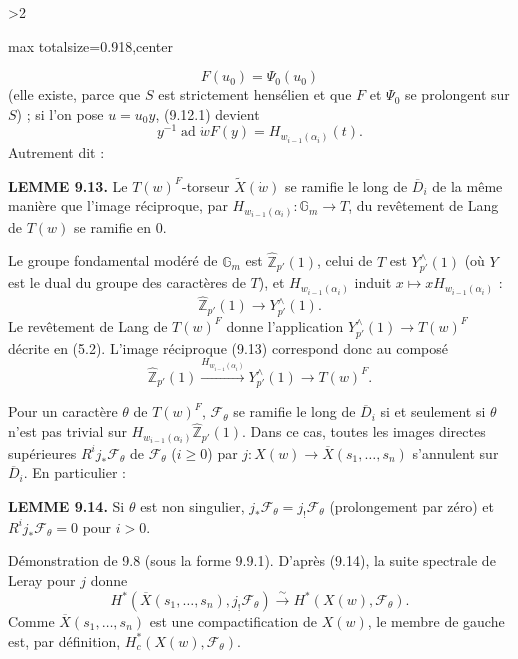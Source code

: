 \documentclass[9pt,twoside]{extarticle}
\newcommand{\EditionPage}[3]{%
  \ifnum#1>2\clearpage\fi
  \pdfbookmark[1]{Printed page #2}{fr-folio-#2}%
  \hypertarget{fr-physical-#1}{}%
  \noindent\begin{adjustbox}{max totalsize={\textwidth}{0.918\textheight},center}
  \begin{minipage}[t]{\textwidth}
  \fontsize{9.4}{11.1}\selectfont\justifying
  #3
  \end{minipage}
  \end{adjustbox}%
}
\begin{document}
\EditionPage{51}{152}{%
\[
F(u_0)=\Psi_0(u_0)
\] (elle existe, parce que \(S\) est strictement hensélien et que \(F\) et \(\Psi_0\) se prolongent sur \(S\)) ; si l'on pose \(u=u_0y\), (9.12.1) devient \[
\tag{9.12.2}
y^{-1}\operatorname{ad}\dot w F(y)=H_{w_{i-1}(\alpha_i)}(t).
\] Autrement dit :\par

\noindent\textbf{LEMME 9.13.} Le \(T(w)^F\)-torseur \(\widetilde X(\dot w)\) se ramifie le long de \(\overline D_i\) de la même manière que l'image réciproque, par \(H_{w_{i-1}(\alpha_i)}:\mathbb G_m\to T\), du revêtement de Lang de \(T(w)\) se ramifie en 0.\par

Le groupe fondamental modéré de \(\mathbb G_m\) est \(\widehat{\mathbb Z}_{p'}(1)\), celui de \(T\) est \(Y_{p'}^{\wedge}(1)\) (où \(Y\) est le dual du groupe des caractères de \(T\)), et \(H_{w_{i-1}(\alpha_i)}\) induit \(x\mapsto xH_{w_{i-1}(\alpha_i)}\) : \[
\widehat{\mathbb Z}_{p'}(1)\longrightarrow Y_{p'}^{\wedge}(1).
\] Le revêtement de Lang de \(T(w)^F\) donne l'application \(Y_{p'}^{\wedge}(1)\to T(w)^F\) décrite en (5.2). L'image réciproque (9.13) correspond donc au composé \[
\widehat{\mathbb Z}_{p'}(1)
\xrightarrow{H_{w_{i-1}(\alpha_i)}}
Y_{p'}^{\wedge}(1)
\longrightarrow T(w)^F.
\]\par

Pour un caractère \(\theta\) de \(T(w)^F\), \(\mathcal F_\theta\) se ramifie le long de \(\overline D_i\) si et seulement si \(\theta\) n'est pas trivial sur \(H_{w_{i-1}(\alpha_i)}\widehat{\mathbb Z}_{p'}(1)\). Dans ce cas, toutes les images directes supérieures \(R^ij_*\mathcal F_\theta\) de \(\mathcal F_\theta\) (\(i\ge0\)) par \(j:X(w)\to\overline X(s_1,\ldots,s_n)\) s'annulent sur \(\overline D_i\). En particulier :\par

\noindent\textbf{LEMME 9.14.} Si \(\theta\) est non singulier, \(j_*\mathcal F_\theta=j_!\mathcal F_\theta\) (prolongement par zéro) et \(R^ij_*\mathcal F_\theta=0\) pour \(i>0\).\par

Démonstration de 9.8 (sous la forme 9.9.1). D'après (9.14), la suite spectrale de Leray pour \(j\) donne \[
H^*(\overline X(s_1,\ldots,s_n),j_!\mathcal F_\theta)
\xrightarrow{\sim}
H^*(X(w),\mathcal F_\theta).
\] Comme \(\overline X(s_1,\ldots,s_n)\) est une compactification de \(X(w)\), le membre de gauche est, par définition, \(H_c^*(X(w),\mathcal F_\theta)\).\par

}
\end{document}
